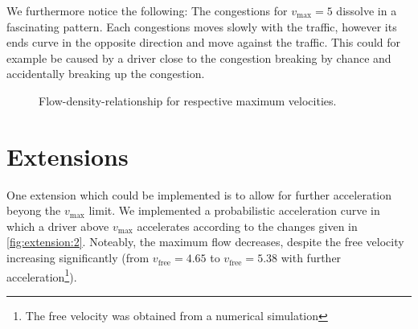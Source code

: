 \documentclass[aps,pra,showpacs,preprintnumbers,amsmath,amssymb,nofootinbib]{revtex4-2}
\begin{document}
    We furthermore notice the following: The congestions for $v_{\mathrm{max}} = 5$ dissolve in a fascinating pattern.
    Each congestions moves slowly with the traffic, however its ends curve in the opposite direction and move against the traffic.
    This could for example be caused by a driver close to the congestion breaking by chance and accidentally breaking up the congestion. 


    \begin{figure}[H]
        \subfloat[$v_{\mathrm{max}} = 1$]{}
        \subfloat[$v_{\mathrm{max}} = 5$]{}
        \caption{Flow-density-relationship for respective maximum velocities.}
    \end{figure}
    
    \section{Extensions}
    
    One extension which could be implemented is to allow for further acceleration beyong the $v_{\mathrm{max}}$ limit. 
    We implemented a probabilistic acceleration curve in which a driver above $v_{\mathrm{max}}$ accelerates according to the changes given in \cref{fig:extension:2}.
    Noteably, the maximum flow decreases, despite the free velocity increasing significantly (from $v_{\mathrm{free}} = 4.65$ to $v_{\mathrm{free}} = 5.38$ with further acceleration\footnote{The free velocity was obtained from a numerical simulation}). 
\end{document}
